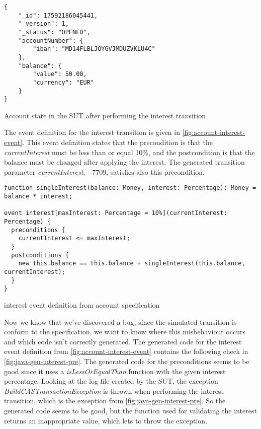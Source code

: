 \begin{sourcecode}[h!]
\begin{lstlisting}[]
{
	"_id": 17592186045441,
	"_version": 1,
	"_status": "OPENED",
	"accountNumber": {
		"iban": "MD14FLBLJOYGVJMDUZVKLU4C"
	},
	"balance": {
		"value": 50.00,
		"currency": "EUR"
	}
}
\end{lstlisting}
\caption{Account state in the SUT after performing the interest transition}
\label{fig:interest-opened-account-json}
\end{sourcecode}

The event definition for the interest transition is given in \autoref{fig:account-interest-event}. This event definition states that the precondition is that the \textit{currentInterest} must be less than or equal 10\%, and the postcondition is that the balance must be changed after applying the interest. The generated transition parameter \textit{currentInterest}, - 7709, satisfies also this precondition. 

\begin{sourcecode}[h!]
\begin{lstlisting}[]
function singleInterest(balance: Money, interest: Percentage): Money =  balance * interest;

event interest[maxInterest: Percentage = 10%](currentInterest: Percentage) {
  preconditions {
    currentInterest <= maxInterest; 
  }
  postconditions {
    new this.balance == this.balance + singleInterest(this.balance, currentInterest);
  }
}
\end{lstlisting}
\caption{interest event definition from account specification}
\label{fig:account-interest-event}
\end{sourcecode}

Now we know that we've discovered a bug, since the simulated transition is conform to the specification, we want to know where this misbehaviour occurs and which code isn't correctly generated. The generated code for the interest event definition from \autoref{fig:account-interest-event} contains the following check in \autoref{fig:java-gen-interest-pre}. The generated code for the preconditions seems to be good since it uses a \textit{isLessOrEqualThan} function with the given interest percentage. Looking at the log file created by the SUT, the exception \textit{BuildCASTransactionException} is thrown when performing the interest transition, which is the exception from \autoref{fig:java-gen-interest-pre}. So the generated code seems to be good, but the function used for validating the interest returns an inappropriate value, which lets to throw the exception.

